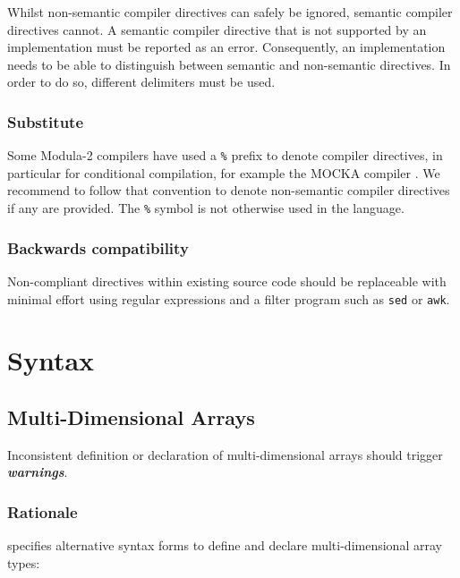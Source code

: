 \documentclass[10pt,a4paper]{article}
\renewcommand{\emph}[1]{\textbf{\textit{#1}}}
\begin{document}
Whilst \glspl{non-semantic compiler directive} can safely be ignored,
\glspl{semantic compiler directive} cannot. A \gls{semantic compiler directive}
that is not supported by an implementation must be reported as an error.
Consequently, an implementation needs to be able to distinguish between
semantic and non-semantic directives. In order to do so, different delimiters
must be used.

\subsubsection{Substitute}

Some Modula-2 compilers have used a \verb|%|
prefix to denote \glspl{compiler directive}, in particular for conditional
compilation, for example the  MOCKA compiler \cite{MOCKA}. We recommend to
follow that convention to denote \glspl{non-semantic compiler directive}
if any are provided. The \verb|%|
symbol is not otherwise used in the language.

\subsubsection{Backwards compatibility}

Non-compliant directives within existing source code should be replaceable with
minimal effort using regular expressions and a filter program such as
\verb|sed| or \verb|awk|. 


\section{Syntax}

\subsection{Multi-Dimensional Arrays}

Inconsistent definition or declaration of multi-dimensional arrays should
trigger \emph{warnings}.

\subsubsection{Rationale}

\cite{Wirth88} specifies alternative syntax forms to define and declare
multi-dimensional array types:
\end{document}
